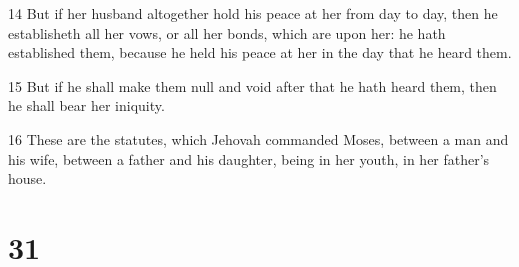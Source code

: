 \par 14 But if her husband altogether hold his peace at her from day to day, then he establisheth all her vows, or all her bonds, which are upon her: he hath established them, because he held his peace at her in the day that he heard them.
\par 15 But if he shall make them null and void after that he hath heard them, then he shall bear her iniquity.
\par 16 These are the statutes, which Jehovah commanded Moses, between a man and his wife, between a father and his daughter, being in her youth, in her father's house.

\chapter{31}

